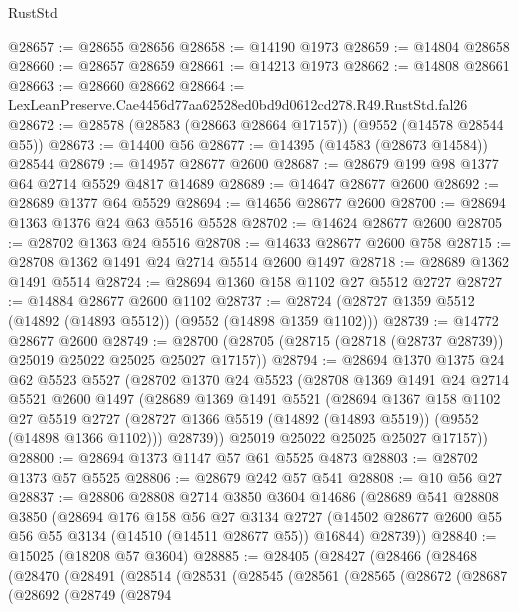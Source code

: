 \begin{lexlean}{RustStd}
\begin{coremodule}
@28657 := @28655 @28656
@28658 := @14190 @1973
@28659 := @14804 @28658
@28660 := @28657 @28659
@28661 := @14213 @1973
@28662 := @14808 @28661
@28663 := @28660 @28662
@28664 := LexLeanPreserve.Cae4456d77aa62528ed0bd9d0612cd278.R49.RustStd.fal26
@28672 := @28578 (@28583 (@28663 @28664 @17157)) (@9552 (@14578 @28544 @55))
@28673 := @14400 @56
@28677 := @14395 (@14583 (@28673 @14584)) @28544
@28679 := @14957 @28677 @2600
@28687 := @28679 @199 @98 @1377 @64 @2714 @5529 @4817 @14689
@28689 := @14647 @28677 @2600
@28692 := @28689 @1377 @64 @5529
@28694 := @14656 @28677 @2600
@28700 := @28694 @1363 @1376 @24 @63 @5516 @5528
@28702 := @14624 @28677 @2600
@28705 := @28702 @1363 @24 @5516
@28708 := @14633 @28677 @2600 @758
@28715 := @28708 @1362 @1491 @24 @2714 @5514 @2600 @1497
@28718 := @28689 @1362 @1491 @5514
@28724 := @28694 @1360 @158 @1102 @27 @5512 @2727
@28727 := @14884 @28677 @2600 @1102
@28737 := @28724 (@28727 @1359 @5512 (@14892 (@14893 @5512)) (@9552 (@14898 @1359 @1102)))
@28739 := @14772 @28677 @2600
@28749 := @28700 (@28705 (@28715 (@28718 (@28737 @28739)) @25019 @25022 @25025 @25027 @17157))
@28794 := @28694
    @1370
    @1375
    @24
    @62
    @5523
    @5527
    (@28702
      @1370
      @24
      @5523
      (@28708
        @1369
        @1491
        @24
        @2714
        @5521
        @2600
        @1497
        (@28689
          @1369
          @1491
          @5521
          (@28694
            @1367
            @158
            @1102
            @27
            @5519
            @2727
            (@28727 @1366 @5519 (@14892 (@14893 @5519)) (@9552 (@14898 @1366 @1102)))
            @28739))
        @25019
        @25022
        @25025
        @25027
        @17157))
@28800 := @28694 @1373 @1147 @57 @61 @5525 @4873
@28803 := @28702 @1373 @57 @5525
@28806 := @28679 @242 @57 @541
@28808 := @10 @56 @27
@28837 := @28806
    @28808
    @2714
    @3850
    @3604
    @14686
    (@28689
      @541
      @28808
      @3850
      (@28694
        @176
        @158
        @56
        @27
        @3134
        @2727
        (@14502 @28677 @2600 @55 @56 @55 @3134 (@14510 (@14511 @28677 @55)) @16844)
        @28739))
@28840 := @15025 (@18208 @57 @3604)
@28885 := @28405
    (@28427
      (@28466
        (@28468
          (@28470
            (@28491
              (@28514
                (@28531
                  (@28545
                    (@28561
                      (@28565
                        (@28672
                          (@28687
                            (@28692
                              (@28749
                                (@28794

\end{coremodule}
\end{lexlean}

